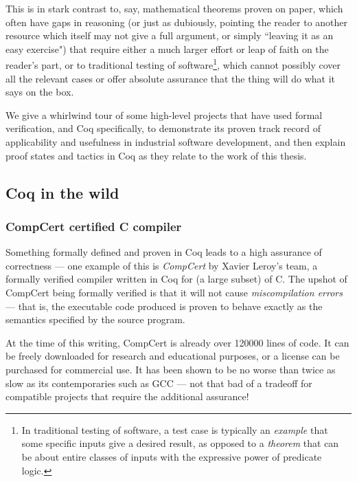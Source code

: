 \documentclass[12pt,notitlepage]{report}
\theoremstyle{plain}
\theoremstyle{definition}
\newcommand{\define}[1]{\emph{#1}\index{#1}}
\numberwithin{equation}{section}
\begin{document}
\par This is in stark contrast to, say, mathematical theorems proven on paper, which often have gaps in reasoning (or just as dubiously, pointing the reader to another resource which itself may not give a full argument, or simply ``leaving it as an easy exercise") that require either a much larger effort or leap of faith on the reader's part, or to traditional testing of software\footnote{In traditional testing of software, a test case is typically an \emph{example} that some specific inputs give a desired result, as opposed to a \emph{theorem} that can be about entire classes of inputs with the expressive power of predicate logic.}, which cannot possibly cover all the relevant cases or offer absolute assurance that the thing will do what it says on the box.  
\par We give a whirlwind tour of some high-level projects that have used formal verification, and Coq specifically, to demonstrate its proven track record of applicability and usefulness in industrial software development, and then explain proof states and tactics in Coq as they relate to the work of this thesis.


\subsection{Coq in the wild}

\subsubsection{CompCert certified C compiler}
Something formally defined and proven in Coq leads to a high assurance of correctness --- one example of this is \define{CompCert} \cite{CompCert} by Xavier Leroy's team, a formally verified compiler written in Coq for (a large subset) of C.  The upshot of CompCert being formally verified is that it will not cause \emph{miscompilation errors} --- that is, the executable code produced is proven to behave exactly as the semantics specified by the source program.
\par At the time of this writing, CompCert is already over 120000 lines of code.  It can be freely downloaded for research and educational purposes, or a license can be purchased for commercial use.  It has been shown to be no worse than twice as slow as its contemporaries such as GCC --- not that bad of a tradeoff for compatible projects that require the additional assurance!
\end{document}
